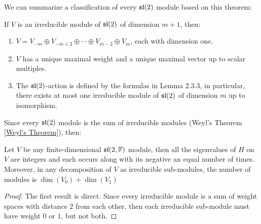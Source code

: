 We can summarize a classification of every  $\mathfrak{sl}(2)$ module based on this theorem:
\begin{teo}
If $V$ is an irreducible module of $\mathfrak{sl}(2)$ of dimension $m+1$, then:
\begin{enumerate}[label=(\alph*)]
	\item $V=V_{-m} \oplus V_{-m+2} \oplus \cdots \oplus V_{m-2} \oplus V_m$, each with dimension one.
	\item $V$ has a unique maximal weight and a unique maximal vector up to scalar multiples.
	\item The $\mathfrak{sl}(2)$-action is defined by the formulas in Lemma $2.3.3$, in particular, there exists at most one irreducible module of $\mathfrak{sl}(2)$ of dimension $m$ up to isomorphism.
\end{enumerate}
\end{teo}
Since every $\mathfrak{sl}(2)$ module is the sum of irreducible modules (Weyl's Theorem \ref{Weyl's Theorem}), then:
\begin{corol}
	Let $V$ be any finite-dimensional $\mathfrak{sl}(2,\mathbb{F})$ module, then all the eigenvalues of $H$ on $V$ are integers and each occurs along with its negative an equal number of times. Moreover, in any decomposition of $V$ as irreducible sub-modules, the number of modules is $\dim(V_0)+\dim(V_1)$
	\label{sl2modules}
\end{corol}
\begin{proof}
	The first result is direct. Since every irreducible module is a sum of weight spaces with distance $2$ from each other, then each irreducible sub-module must have weight $0$ or $1$, but not both.
\end{proof}